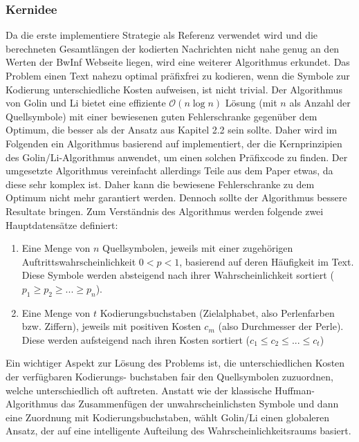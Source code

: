 \documentclass[a4paper,10pt,ngerman]{scrartcl}
\begin{document}
\subsubsection{Kernidee}
Da die erste implementiere Strategie als Referenz verwendet wird und die berechneten Gesamtlängen der kodierten Nachrichten nicht nahe genug an den Werten der BwInf Webseite liegen, wird eine weiterer Algorithmus erkundet. Das Problem einen Text nahezu optimal präfixfrei zu kodieren, wenn die Symbole zur Kodierung unterschiedliche Kosten aufweisen, ist nicht trivial. Der Algorithmus von Golin und Li \cite{papergolinli} bietet eine effiziente $\mathcal{O}(n \log n)$ Lösung (mit $n$ als Anzahl der Quellsymbole) mit einer bewiesenen guten Fehlerschranke gegenüber dem Optimum, die besser als der Ansatz aus Kapitel 2.2 sein sollte. Daher wird im Folgenden ein Algorithmus basierend auf \cite[Fig 6. und Kapitel 4]{papergolinli} implementiert, der die Kernprinzipien des Golin/Li-Algorithmus anwendet, um einen solchen Präfixcode zu finden. Der umgesetzte Algorithmus vereinfacht allerdings Teile aus dem Paper etwas, da diese sehr komplex ist. Daher kann die bewiesene Fehlerschranke zu dem Optimum nicht mehr garantiert werden. Dennoch sollte der Algorithmus bessere Resultate bringen. 
\newline
Zum Verständnis des Algorithmus werden folgende zwei Hauptdatensätze definiert:
\begin{enumerate}
  \item Eine Menge von $n$ Quellsymbolen, jeweils mit einer zugehörigen Auftrittswahrscheinlichkeit $0 < p < 1$, basierend auf deren Häufigkeit im Text. Diese Symbole werden absteigend nach ihrer Wahrscheinlichkeit sortiert ($p_{1} \ge p_{2} \ge ... \ge p_{n}$). 
  \item Eine Menge von $t$ Kodierungsbuchstaben (Zielalphabet, also Perlenfarben bzw. Ziffern), jeweils mit positiven Kosten $c_{m}$ (also Durchmesser der Perle). Diese werden aufsteigend nach ihren Kosten sortiert ($c_{1} \le c_{2} \le ... \le c_{t}$)
\end{enumerate}
Ein wichtiger Aspekt zur Lösung des Problems ist, die unterschiedlichen Kosten der verfügbaren Kodierungs- buchstaben fair den Quellsymbolen zuzuordnen, welche unterschiedlich oft auftreten. Anstatt wie der klassische Huffman-Algorithmus das Zusammenfügen der unwahrscheinlichsten Symbole und dann eine Zuordnung mit Kodierungsbuchstaben, wählt Golin/Li einen globaleren Ansatz, der auf eine intelligente Aufteilung des Wahrscheinlichkeitsraums basiert. 
\newline
\end{document}
